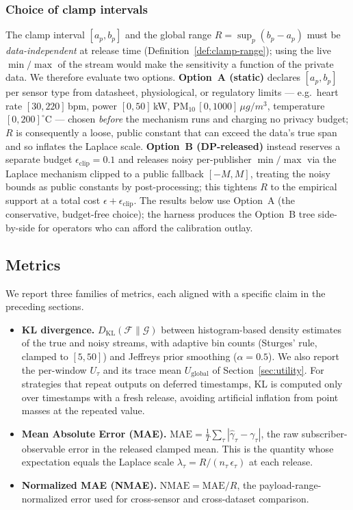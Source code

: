 \subsubsection{Choice of clamp intervals}
\label{sec:clamp-choice}
The clamp interval $[a_p,b_p]$ and the global range $R=\sup_p(b_p-a_p)$ must be \emph{data-independent} at release time (Definition~\ref{def:clamp-range}); using the live $\min/\max$ of the stream would make the sensitivity a function of the private data. We therefore evaluate two options. \textbf{Option~A (static)} declares $[a_p,b_p]$ per sensor type from datasheet, physiological, or regulatory limits --- e.g.\ heart rate $[30,220]$\,bpm, power $[0,50]$\,kW, $\text{PM}_{10}\,[0,1000]\,\mu g/m^3$, temperature $[0,200]^\circ$C --- chosen \emph{before} the mechanism runs and charging no privacy budget; $R$ is consequently a loose, public constant that can exceed the data's true span and so inflates the Laplace scale. \textbf{Option~B (DP-released)} instead reserves a separate budget $\epsilon_{\text{clip}}=0.1$ and releases noisy per-publisher $\min/\max$ via the Laplace mechanism clipped to a public fallback $[-M,M]$, treating the noisy bounds as public constants by post-processing; this tightens $R$ to the empirical support at a total cost $\epsilon+\epsilon_{\text{clip}}$. The results below use Option~A (the conservative, budget-free choice); the harness produces the Option~B tree side-by-side for operators who can afford the calibration outlay.

\subsection{Metrics}
\label{sec:metrics}

We report three families of metrics, each aligned with a specific claim in the preceding sections.

\begin{itemize}
\item \textbf{KL divergence.} $D_{\mathrm{KL}}(\mathcal{F} \| \mathcal{G})$ between histogram-based density estimates of the true and noisy streams, with adaptive bin counts (Sturges' rule, clamped to $[5, 50]$) and Jeffreys prior smoothing ($\alpha = 0.5$). We also report the per-window $U_\tau$ and its trace mean $U_{\text{global}}$ of Section~\ref{sec:utility}. For strategies that repeat outputs on deferred timestamps, KL is computed only over timestamps with a fresh release, avoiding artificial inflation from point masses at the repeated value.
\item \textbf{Mean Absolute Error (MAE).} $\mathrm{MAE} = \tfrac{1}{T}\sum_\tau |\hat{\gamma} _\tau - \gamma_\tau|$, the raw subscriber-observable error in the released clamped mean. This is the quantity whose expectation equals the Laplace scale $\lambda_\tau = R/(n_\tau\,\epsilon_\tau)$ at each release.
\item \textbf{Normalized MAE (NMAE).} $\mathrm{NMAE} = \mathrm{MAE}/R$, the payload-range-normalized error used for cross-sensor and cross-dataset comparison.
\end{itemize}

